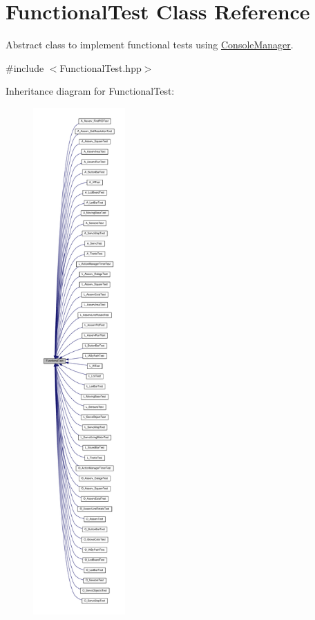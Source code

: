 \hypertarget{classFunctionalTest}{}\section{Functional\+Test Class Reference}
\label{classFunctionalTest}


Abstract class to implement functional tests using \hyperlink{classConsoleManager}{Console\+Manager}.  




{\ttfamily \#include $<$Functional\+Test.\+hpp$>$}



Inheritance diagram for Functional\+Test\+:
\nopagebreak
\begin{figure}[H]
\begin{center}
\leavevmode
\includegraphics[height=550pt]{classFunctionalTest__inherit__graph}
\end{center}
\end{figure}
